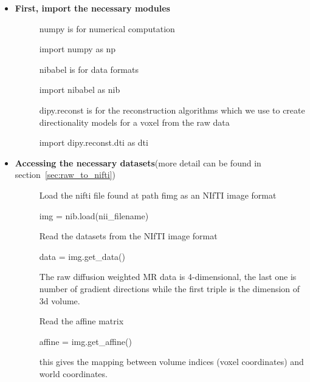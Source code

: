 \begin{itemize}
	\item \textbf{First, import the necessary modules}

\begin{description}
	\item[]
numpy is for numerical computation
\begin{python}
import numpy as np
\end{python}

	\item[]
nibabel is for data formats

\begin{python}
import nibabel as nib
\end{python}

	\item[]
dipy.reconst is for the reconstruction algorithms which we use to create directionality models for a voxel from the raw data

\begin{python}
import dipy.reconst.dti as dti
\end{python}

\end{description}

\item \textbf{Accessing the necessary datasets}(more detail can be found in section~\ref{sec:raw_to_nifti})
	
	\begin{description}
		\item[]
		Load the nifti file found at path fimg as an NIfTI image format 
		
\begin{python}
img = nib.load(nii_filename)
\end{python}

		\item[]
		Read the datasets from the NIfTI image format
\begin{python}
data = img.get_data()
\end{python}
		
		The raw diffusion weighted MR data is 4-dimensional, the last one is number of gradient directions while the first triple is the dimension of 3d volume.

		\item[]
		Read the affine matrix
\begin{python}
affine = img.get_affine()
\end{python}
		
		this gives the mapping between volume indices (voxel coordinates) and world coordinates.


\end{description}
\end{itemize}
